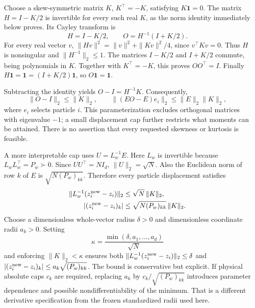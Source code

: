 \documentclass[11pt,a4paper]{article}
\newcommand{\one}{\mathbf 1}
\begin{document}
Choose a skew-symmetric matrix \(K\), \(K^\top=-K\), satisfying \(K\one=0\).
The matrix \(H=I-K/2\) is invertible for every such real \(K\), as the
norm identity immediately below proves. Its Cayley transform is
\begin{equation}
\label{eq:cayley}
 H=I-K/2,\qquad O=H^{-1}(I+K/2).
\end{equation}
For every real vector \(v\),
\(\|Hv\|^2=\|v\|^2+\|Kv\|^2/4\), since \(v^\top Kv=0\).
Thus \(H\) is nonsingular and \(\|H^{-1}\|_2\leq1\).
The matrices \(I-K/2\) and \(I+K/2\) commute, being polynomials in \(K\).
Together with \(K^\top=-K\), this proves \(OO^\top=I\).
Finally \(H\one=\one=(I+K/2)\one\), so \(O\one=\one\).

Subtracting the identity yields \(O-I=H^{-1}K\). Consequently,
\begin{equation}
\label{eq:cayley-bound}
 \|O-I\|_2\leq\|K\|_2,\qquad
 \|(EO-E)e_i\|_2\leq\|E\|_2\|K\|_2,
\end{equation}
where \(e_i\) selects particle \(i\).
This parameterization excludes orthogonal matrices with eigenvalue \(-1\);
a small displacement cap further restricts what moments can be attained.
There is no assertion that every requested skewness or kurtosis is feasible.

A more interpretable cap uses \(U=L_w^{-1}E\). Here \(L_w\) is invertible
because \(L_wL_w^\top=P_w\succ0\). Since \(UU^\top=NI_d\),
\(\|U\|_2=\sqrt N\). Also the Euclidean norm of row \(k\) of \(E\) is
\(\sqrt{N(P_w)_{kk}}\). Therefore every particle displacement satisfies
\begin{align}
\label{eq:dual-caps}
 \|L_w^{-1}(z_i^{\rm new}-z_i)\|_2
       &\leq\sqrt N\,\|K\|_2,\\
 |(z_i^{\rm new}-z_i)_k|
       &\leq\sqrt{N(P_w)_{kk}}\,\|K\|_2 .
 \nonumber
\end{align}
Choose a dimensionless whole-vector radius \(\delta>0\) and dimensionless
coordinate radii \(a_k>0\). Setting
\begin{equation}
\label{eq:kappa}
 \kappa=\frac{\min(\delta,a_1,\ldots,a_d)}{\sqrt N}
\end{equation}
and enforcing \(\|K\|_2<\kappa\) ensures both
\(\|L_w^{-1}(z_i^{\rm new}-z_i)\|_2\leq\delta\) and
\(|(z_i^{\rm new}-z_i)_k|\leq a_k\sqrt{(P_w)_{kk}}\).
The bound is conservative but explicit. If physical absolute caps \(c_k\)
are required, replacing \(a_k\) by \(c_k/\sqrt{(P_w)_{kk}}\) introduces
parameter dependence and possible nondifferentiability of the minimum.
That is a different derivative specification from the frozen standardized
radii used here.
\end{document}
